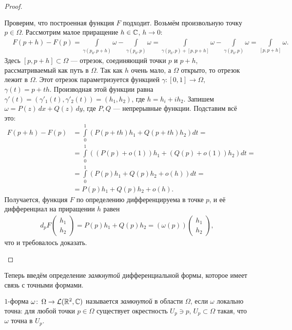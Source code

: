 \begin{proof}
\begin{itemize}
   Проверим, что построенная функция $F$ подходит. Возьмём произвольную точку $p \in \Omega$. Рассмотрим малое приращение $h \in \mathbb{C}$, $h \to 0$:
   \begin{align*}
    &F(p + h) - F(p) = \int\limits_{\gamma(p_0,p + h)}  \omega - \int\limits_{\gamma(p_0,p)}  \omega = \int\limits_{\gamma(p_0,p) + [p,p+h]} \omega - \int\limits_{\gamma(p_0,p)}   \omega = \int\limits_{[p,p+h]} \omega.
   \end{align*} Здесь $[p,p+h] \subset \Omega$ --- отрезок, соединяющий точки $p$ и $p + h$, рассматриваемый как путь в $\Omega$. Так как $h$ очень мало, а $\Omega$ открыто, то отрезок лежит в $\Omega$. Этот отрезок параметризуется функцией $\gamma \colon [0,1] \to \Omega$, $\gamma(t) = p + th$. Производная этой функции равна $\gamma'(t) = (\gamma'_1(t), \gamma'_2(t)) = (h_1, h_2)$, где $h = h_i + i h_2$. Запишем $\omega = P(z)\,dx + Q(z)\,dy$, где $P,Q$ --- непрерывные функции. Подставим всё это:
   \begin{align*}
    F(p+h)-F(p) &= \int\limits_{0}^{1} \left( P(p+th) h_1 + Q(p+th) h_2 \right)dt = \\
    &=  \int\limits_{0}^{1} \left( (P(p) + o(1))h_1 + (Q(p) + o(1))h_2 \right)dt = \\
    &= \int\limits_{0}^{1} \left( P(p)h_1 + Q(p)h_2 + o(h) \right)dt = \\
    &= P(p)h_1 + Q(p)h_2 + o(h).
   \end{align*} Получается, функция $F$ по определению дифференцируема в точке $p$, и её дифференциал на приращении $h$ равен
   \begin{align*}
    d_p F \begin{pmatrix}
     h_1 \\ h_2
     \end{pmatrix} = P(p) h_1 + Q(p) h_2 = \left( \omega(p) \right) \begin{pmatrix}
     h_1 \\ h_2
    \end{pmatrix}
   ,\end{align*} что и требовалось доказать.
 \end{itemize}
\end{proof}

Теперь введём определение \textit{замкнутой} дифференциальной формы, которое имеет связь с точными формами.

\begin{df}
 $1$-форма $\omega \colon\,\Omega\to\mathcal{L}(\mathbb{R}^2, \mathbb{C})$ называется \textit{замкнутой} в области $\Omega$, если $\omega$ локально точна: для любой точки $p \in \Omega$ существует окрестность $U_p \ni p$, $U_p \subset \Omega$ такая, что $\omega$ точна в $U_p$.
\end{df}


